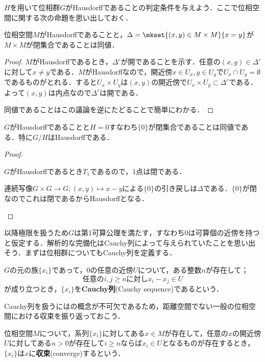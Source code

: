 $H$を用いて位相群$G$がHausdorffであることの判定条件を与えよう．ここで位相空間に関する次の命題を思い出しておく．

\begin{prop}\label{prop:Hausdorffと対角線}
	位相空間$M$がHausdorffであることと，$\Delta=\mkset{(x,y)\in M\times M}{x=y}$が$M\times M$が閉集合であることは同値．
\end{prop}
\begin{proof}
	$M$がHausdorffであるとき，$\Delta^c$が開であることを示す．任意の$(x,y)\in\Delta^c$に対して$x\neq y$である．$M$がHausdorffなので，開近傍$x\in U_x,y\in U_y$で$U_x\cap U_y=\emptyset$であるものがとれる．すると$U_x\times U_y$は$(x,y)$の開近傍で$U_x\times U_y\subset\Delta^c$である．よって$(x,y)$は内点なので$\Delta^c$は開である．
	
	同値であることはこの議論を逆にたどることで簡単にわかる．
\end{proof}

\begin{prop}\label{prop:位相群がHdfになる条件}
	$G$がHausdorffであることと$H=0$すなわち$\{0\}$が閉集合であることは同値である．特に$G/H$はHausdorffである．
\end{prop}

\begin{proof}
	\begin{eqv}
		\item $G$がHausdorffであるとき$T_1$であるので，1点は閉である．
		\item 連続写像$G\times G\to G;(x,y)\mapsto x-y$による$\{0\}$の引き戻しは$\Delta$である．$\{0\}$が閉なのでこれは閉であるからHausdorffとなる．
	\end{eqv}
\end{proof}

以降極限を扱うため$G$は第1可算公理を満たす，すなわち$0$は可算個の近傍を持つと仮定する．解析的な完備化はCauchy列によって与えられていたことを思い出そう．まずは位相群についてもCauchy列を定義する．

\begin{defi}[Cauchy列]
	$G$の元の族$\{x_i\}$であって，$0$の任意の近傍$U$について，ある整数$n$が存在して；
	\[\text{任意の}i,j\geq n\text{に対し} x_i-x_j\in U\]
	が成り立つとき，$\{x_i\}$を\textbf{Cauchy列}(Cauchy sequence)であるという．
\end{defi}

Cauchy列を扱うにはの概念が不可欠であるため，距離空間でない一般の位相空間における収束を振り返っておこう．

\begin{defi}[収束]
	位相空間$M$について，系列$\{x_i\}$に対してある$x\in M$が存在して，任意の$x$の開近傍$U$に対してある$n>0$が存在して$i\geq n$ならば$x_i\in U$となるものが存在するとき，$\{x_i\}$は$x$に\textbf{収束}(converge)するという．
\end{defi}

